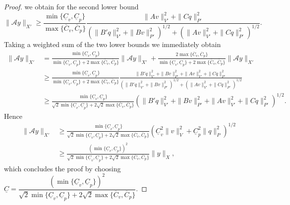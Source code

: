 \begin{proof}
we obtain for the second lower bound
\[
\|\mathcal Ay\|_{X'}\geq \frac{\min\{\underline{C}_v,\underline{C}_p\}}{\max\{\overline{C}_v, \overline{C}_p\}}\frac{\|Av\|_{V'}^2+\|Cq\|_{P'}^2}{\left(\|B'q\|_{V'}^2 + \|Bv\|_{P'}^2\right)^{1/2} + \left(\|Av\|_{V'}^2 + \|Cq\|_{P'}^2\right)^{1/2}}.
\]
Taking a weighted sum of the two lower bounds we immediately obtain
\begin{align*}
\|\mathcal Ay\|_{X'}&=\frac{\min\{\underline{C}_v,\underline{C}_p\}}{\min\{\underline{C}_v,\underline{C}_p\}+2\max\{\overline{C}_v, \overline{C}_p\}}\|\mathcal Ay\|_{X'}+\frac{2\max\{\overline{C}_v, \overline{C}_p\}}{\min\{\underline{C}_v,\underline{C}_p\}+2\max\{\overline{C}_v, \overline{C}_p\}}\|\mathcal Ay\|_{X'} \\
&\geq\frac{\min\{\underline{C}_v,\underline{C}_p\}}{\min\{\underline{C}_v,\underline{C}_p\}+2\max\{\overline{C}_v, \overline{C}_p\}}\frac{\|B'q\|_{V'}^2 + \|Bv\|_{P'}^2 + \|Av\|_{V'}^2 + \|Cq\|_{P'}^2}{\left(\|B'q\|_{V'}^2 + \|Bv\|_{P'}^2\right)^{1/2} + \left(\|Av\|_{V'}^2 + \|Cq\|_{P'}^2\right)^{1/2}} \\
&\geq\frac{\min\{\underline{C}_v,\underline{C}_p\}}{\sqrt{2}\min\{\underline{C}_v,\underline{C}_p\}+2\sqrt{2}\max\{\overline{C}_v, \overline{C}_p\}}\left(\|B'q\|_{V'}^2 + \|Bv\|_{P'}^2 + \|Av\|_{V'}^2 + \|Cq\|_{P'}^2\right)^{1/2}.
\end{align*}
Hence
\begin{align*}
\|\mathcal Ay\|_{X'}&\geq \frac{\min\{\underline{C}_v,\underline{C}_p\}}{\sqrt{2}\min\{\underline{C}_v,\underline{C}_p\}+2\sqrt{2}\max\{\overline{C}_v, \overline{C}_p\}}\left(\underline{C}_v^2\|v\|_V^2+\underline{C}_p^2\|q\|_P^2\right)^{1/2}\\
&\geq \frac{\left(\min\{\underline{C}_v,\underline{C}_p\}\right)^2}{\sqrt{2}\min\{\underline{C}_v,\underline{C}_p\}+2\sqrt{2}\max\{\overline{C}_v, \overline{C}_p\}}\|y\|_X,
\end{align*}
which concludes the proof by choosing $\underline{C}=\dfrac{\left(\min\{\underline{C}_v,\underline{C}_p\}\right)^2}{\sqrt{2}\min\{\underline{C}_v,\underline{C}_p\}+2\sqrt{2}\max\{\overline{C}_v, \overline{C}_p\}}$.
\end{proof}

